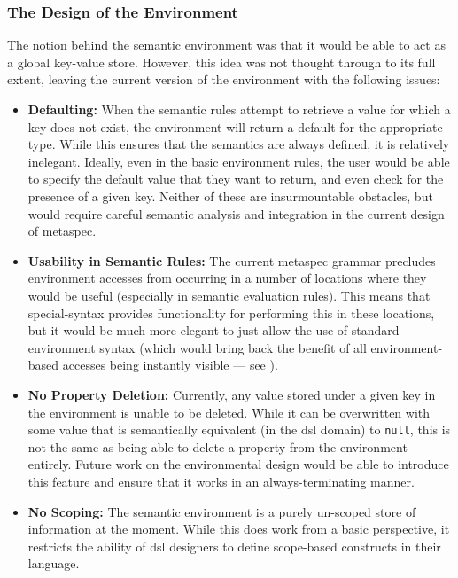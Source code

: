 \subsubsection{The Design of the Environment} %
\label{ssub:the_design_of_the_environment}
The notion behind the semantic environment was that it would be able to act as a global key-value store. 
However, this idea was not thought through to its full extent, leaving the current version of the environment with the following issues:
\begin{itemize}
    \item \textbf{Defaulting:} When the semantic rules attempt to retrieve a value for which a key does not exist, the environment will return a default for the appropriate type. 
    While this ensures that the semantics are always defined, it is relatively inelegant. 
    Ideally, even in the basic environment rules, the user would be able to specify the default value that they want to return, and even check for the presence of a given key.
    Neither of these are insurmountable obstacles, but would require careful semantic analysis and integration in the current design of metaspec.
    \item \textbf{Usability in Semantic Rules:} The current metaspec grammar precludes environment accesses from occurring in a number of locations where they would be useful (especially in semantic evaluation rules).
    This means that special-syntax provides functionality for performing this in these locations, but it would be much more elegant to just allow the use of standard environment syntax (which would bring back the benefit of all environment-based accesses being instantly visible --- see ).
    \item \textbf{No Property Deletion:} Currently, any value stored under a given key in the environment is unable to be deleted.
    While it can be overwritten with some value that is semantically equivalent (in the \gls{dsl} domain) to \texttt{null}, this is not the same as being able to delete a property from the environment entirely.
    Future work on the environmental design would be able to introduce this feature and ensure that it works in an always-terminating manner. 
    \item \textbf{No Scoping:} The semantic environment is a purely un-scoped store of information at the moment.
    While this does work from a basic perspective, it restricts the ability of \gls{dsl} designers to define scope-based constructs in their language.

\end{itemize}
